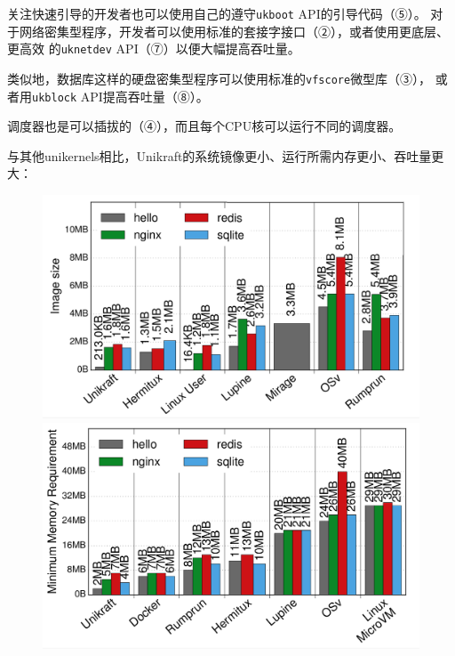 \documentclass[UTF8,fontset=none,linespread=1.15]{ctexart}
\begin{document}
关注快速引导的开发者也可以使用自己的遵守\texttt{ukboot} API的引导代码（⑤）。
对于网络密集型程序，开发者可以使用标准的套接字接口（②），或者使用更底层、更高效
的\texttt{uknetdev} API（⑦）以便大幅提高吞吐量。

类似地，数据库这样的硬盘密集型程序可以使用标准的\texttt{vfscore}微型库（③），
或者用\texttt{ukblock} API提高吞吐量（⑧）。

调度器也是可以插拔的（④），而且每个CPU核可以运行不同的调度器。


与其他unikernels相比，Unikraft的系统镜像更小、运行所需内存更小、吞吐量更大：
\begin{figure}[H]
\centering
\begin{minipage}{0.32\linewidth}
\includegraphics[width=1\linewidth]{pictures/Unikraft-image-size.png}
\caption{}
\label{fig:unikraft-image-size}
\end{minipage}
\begin{minipage}{0.32\linewidth}
\includegraphics[width=1\linewidth]{pictures/Unikraft-memory.png}
\caption{}
\end{minipage}

\end{figure}
\end{document}
